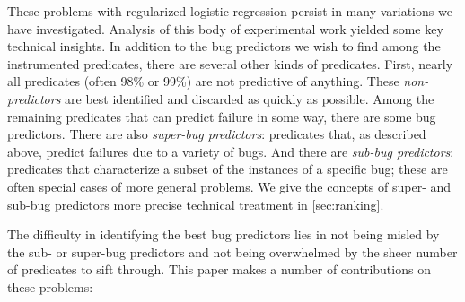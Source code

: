 \documentclass[draft]{sig-alternate}
\newcommand{\termdef}[1]{\emph{#1}}
\begin{document}
These problems with regularized logistic regression persist in many variations
we have investigated. Analysis of this body of experimental work yielded some
key technical insights.  In addition to the bug predictors we wish to
find among the instrumented predicates, there are several other kinds
of predicates.  First, nearly all predicates (often 98\% or 99\%) are
not predictive of anything.  These \termdef{non-predictors} are best identified and discarded as
quickly as possible. Among the remaining predicates that can
predict failure in some way, there are some bug predictors.
There are also \termdef{super-bug predictors}: predicates that, as
described above, predict failures due to a variety of bugs.  And there
are \termdef{sub-bug predictors}: predicates that characterize a subset of
the instances of a specific bug; these are often special cases of more
general problems.  We give the concepts of super- and sub-bug
predictors more precise technical treatment in
\autoref{sec:ranking}.

The difficulty in identifying the best bug predictors lies in not being
misled by the sub- or super-bug predictors and not being overwhelmed
by the sheer number of predicates to sift through.
This paper makes a number of contributions on these problems:
\end{document}
